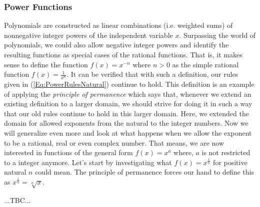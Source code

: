 

\subsubsection{Power Functions} 
Polynomials are constructed as linear combinations (i.e. weighted sums) of nonnegative integer powers of the independent variable $x$. Surpassing the world of polynomials, we could also allow negative integer powers and identify the resulting functions as special cases of the rational functions. That is, it makes sense to define the function $f(x) = x^{-n}$ where $n > 0$ as the simple rational function $f(x) = \frac{1}{x^n}$. It can be verified that with such a definition, our rules given in (\ref{Eq:PowerRulesNatural}) continue to hold. This definition is an example of applying the \emph{principle of permanence} which says that, whenever we extend an existing definition to a larger domain, we should strive for doing it in such a way that our old rules continue to hold in this larger domain. Here, we extended the domain for allowed exponents from the natural to the integer numbers. Now we will generalize even more and look at what happens when we allow the exponent to be a rational, real or even complex number. That means, we are now interested in functions of the general form $f(x) = x^a$ where, $a$ is not restricted to a integer anymore. Let's start by investigating what $f(x) = x^{\frac{1}{n}}$ for positive natural $n$ could mean. The principle of permanence forces our hand to define this as $x^{\frac{1}{n}} = \sqrt[n]{x}$.

...TBC...




%






